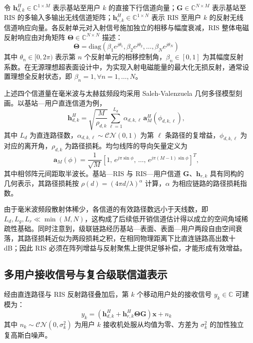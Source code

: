 令 $\bm{h}_{d,k}^H \in \mathbb{C}^{1 \times M}$ 表示基站至用户 $k$ 的直接下行信道向量；$\bm{G} \in \mathbb{C}^{N \times M}$ 表示基站至 RIS 的多输入多输出无线信道矩阵；$\bm{h}_{r,k}^H \in \mathbb{C}^{1 \times N}$ 表示 RIS 至用户 $k$ 的反射无线信道响应向量。各反射单元对入射信号施加独立的相移与幅度衰减，RIS 整体电磁反射响应由对角矩阵 $\bm{\Theta} \in \mathbb{C}^{N \times N}$ 描述：
\begin{equation}
  \bm{\Theta} = \mathrm{diag}\left( \beta_1 e^{j\theta_1}, \beta_2 e^{j\theta_2}, \dots, \beta_N e^{j\theta_N} \right)
  \label{eq:ris_theta_matrix}
\end{equation}
其中 $\theta_n \in [0, 2\pi)$ 表示第 $n$ 个反射单元的相移控制角，$\beta_n \in [0, 1]$ 为其幅度反射系数。在无源理想超表面设计中，为实现入射电磁能量的最大化无损反射，通常设置理想全反射状态，即 $\beta_n = 1, \forall n=1,\dots,N$。

上述四个信道量在毫米波与太赫兹频段均采用 Saleh-Valenzuela 几何多径模型刻画。以基站—用户直连信道为例，
\begin{equation}
  \bm{h}_{d,k}^H = \sqrt{\frac{M}{\rho_{d,k}}} \sum_{\ell=1}^{L_d} \alpha_{d,k,\ell}\, \bm{a}_M^H(\phi_{d,k,\ell}),
  \label{eq:channel_geometry}
\end{equation}
其中 $L_d$ 为直连路径数，$\alpha_{d,k,\ell} \sim \mathcal{CN}(0,1)$ 为第 $\ell$ 条路径的复增益，$\phi_{d,k,\ell}$ 为对应的离开角，$\rho_{d,k}$ 为路径损耗。均匀线阵的导向矢量定义为
\begin{equation}
  \bm{a}_M(\phi) = \frac{1}{\sqrt{M}} \left[ 1,\, e^{j\pi\sin\phi},\, \dots,\, e^{j\pi (M-1)\sin\phi} \right]^T,
  \label{eq:array_response}
\end{equation}
其中相邻阵元间距取半波长。基站—RIS 与 RIS—用户信道 $\bm{G}$、$\bm{h}_{r,k}$ 具有同构的几何表示，其路径损耗按 $\rho(d) = (4\pi d/\lambda)^{\alpha}$ 计算，$\alpha$ 为相应链路的路径损耗指数。

由于毫米波频段散射体稀少，各信道的有效路径数远小于天线数，即 $L_d, L_g, L_r \ll \min(M,N)$，这构成了后续低开销信道估计得以成立的空间角域稀疏性基础。同时注意到，级联链路经历基站—表面、表面—用户两段自由空间衰落，其路径损耗近似为两段损耗之积，在相同物理距离下比直连链路高出数十 dB；因此 RIS 必须在阵列增益与反射聚焦上提供足够补偿，才能形成有效增益。

\subsection{多用户接收信号与复合级联信道表示}
\label{sec:rx_model}

经由直连路径与 RIS 反射路径叠加后，第 $k$ 个移动用户处的接收信号 $y_k \in \mathbb{C}$ 可建模为：
\begin{equation}
  y_k = \left( \bm{h}_{d,k}^H + \bm{h}_{r,k}^H \bm{\Theta} \bm{G} \right) \bm{x} + n_k
  \label{eq:user_received_signal}
\end{equation}
其中 $n_k \sim \mathcal{CN}(0, \sigma_k^2)$ 为用户 $k$ 接收机处服从均值为零、方差为 $\sigma_k^2$ 的加性独立复高斯白噪声。

